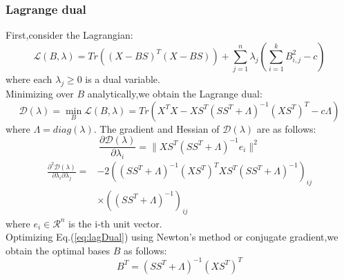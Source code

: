 \documentclass{beamer}
\begin{document}
\begin{frame}[allowframebreaks]\frametitle{Lagrange dual}
First,consider the Lagrangian:
\begin{equation}\label{eq:lagrange}
\mathcal{L}(B,\lambda)=Tr((X-BS)^T(X-BS))+\sum_{j=1}^n\lambda_j(\sum_{i=1}^k B_{i,j}^2-c)
\end{equation}
where each $\lambda_j\geq 0$ is a dual variable.\\
Minimizing over $B$ analytically,we obtain the Lagrange dual:
\begin{equation}\label{eq:lagDual}
\mathcal{D}(\lambda)=\min_B \mathcal{L}(B,\lambda)=Tr(X^TX-XS^T(SS^T+\Lambda)^{-1}(XS^T)^T-c\Lambda)
\end{equation}
where $\Lambda=diag(\lambda)$.
\newpage
The gradient and Hessian of $\mathcal{D}(\lambda)$ are as follows:
\begin{equation}\label{eq:lagGradient}
\frac{\partial \mathcal{D}(\lambda)}{\partial \lambda_i}=\|XS^T(SS^T+\Lambda)^{-1}e_i\|^2
\end{equation}
\begin{equation}\label{eq:lagHessian}
\begin{split}
\frac{\partial^2 \mathcal{D}(\lambda)}{\partial \lambda_i \partial \lambda_j}=&-2((SS^T+\Lambda)^{-1}(XS^T)^TXS^T(SS^T+\Lambda)^{-1})_{ij}\\
&\times((SS^T+\Lambda)^{-1})_{ij}
\end{split}
\end{equation}
where $e_i\in \mathcal{R}^n$ is the i-th unit vector.\\
\medskip
Optimizing Eq.(\ref{eq:lagDual}) using Newton's method or conjugate gradient,we obtain the optimal bases $B$ as follows:
\begin{equation}\label{eq:bases}
B^T=(SS^T+\Lambda)^{-1}(XS^T)^T
\end{equation}
\end{frame}
\end{document}
